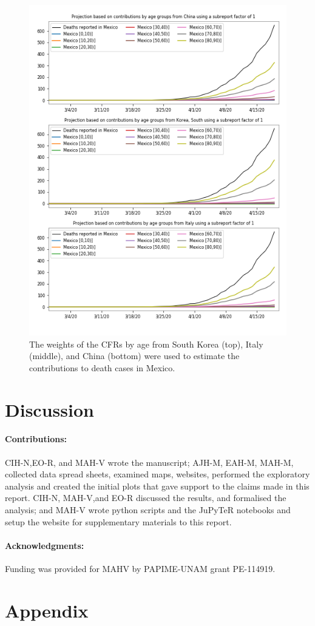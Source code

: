 \documentclass[8pt]{article}
\begin{document}
\begin{figure}[h]
    \centering
    \includegraphics[width=\textwidth]{figures/tsam_Covid19_JHU_cfr+propDeathCasesByAgeTS_EstimatesMexico_subReportFactor1.png}
    \caption{The weights of the CFRs by age from South Korea (top), Italy (middle), and China (bottom) were used to estimate the contributions to death cases in Mexico.}
    \label{fig:cfrsAge}
\end{figure}


\section{Discussion}



\paragraph{Contributions:} CIH-N,EO-R, and MAH-V  wrote the manuscript; AJH-M, EAH-M, MAH-M, collected data spread sheets, examined maps, websites, performed the exploratory analysis and created the initial plots that gave support to the claims made in this report. CIH-N, MAH-V,and EO-R discussed the results, and formalised the analysis; and MAH-V wrote python scripts and the JuPyTeR notebooks and setup the website for supplementary materials to this report. 

\paragraph{Acknowledgments:} Funding was provided for MAHV by PAPIME-UNAM grant PE-114919.

\newpage
\section{Appendix}





\end{document}
